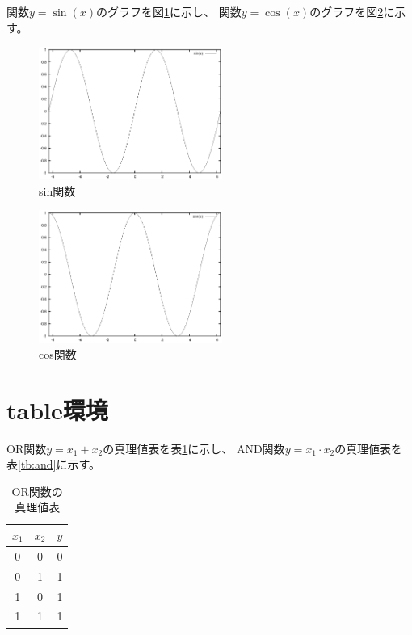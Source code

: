 \documentclass[12pt,a4j,twocolumn]{jarticle}
\begin{document}
関数$y=\sin(x)$のグラフを図\ref{fg:sin}に示し、
関数$y=\cos(x)$のグラフを図\ref{fg:cos}に示す。
%
\begin{figure}[tb]
	\begin{center}
	\includegraphics[width=6cm]{sin.eps}
	\end{center}
	\caption{sin関数}
	\label{fg:sin}
\end{figure}
%
\begin{figure}[tb]
	\begin{center}
	\includegraphics[width=6cm]{cos.eps}
	\end{center}
	\caption{cos関数}
	\label{fg:cos}
\end{figure}


\newpage

\section{table環境}

OR関数$y = x_1 + x_2$の真理値表を表\ref{tb:or}に示し、
AND関数$y = x_1 \cdot x_2$の真理値表を表\ref{tb:and}に示す。

\begin{table}[tb]
	\caption{OR関数の真理値表}
	\label{tb:or}
	\begin{center}
	  \begin{tabular}{|c|c||c|}
		\hline
		$x_1$ & $x_2$ & $y$ \\ \hline\hline
		    0 &     0 &   0 \\ \hline
		    0 &     1 &   1 \\ \hline
		    1 &     0 &   1 \\ \hline
		    1 &     1 &   1 \\ \hline
	\end{tabular}
	\end{center}
\end{table}
\end{document}
